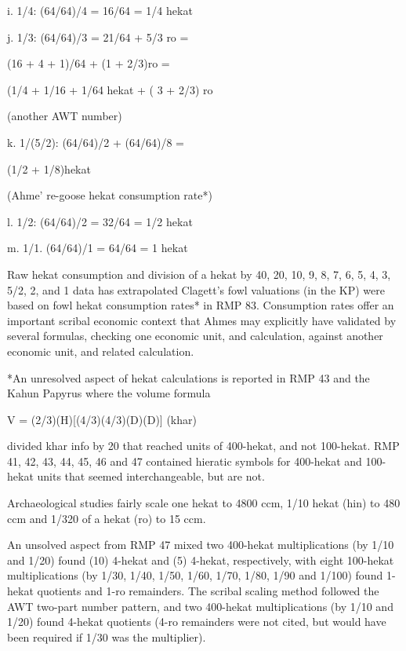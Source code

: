 \documentclass[12pt]{article}
\begin{document}
i. 1/4: (64/64)/4 = 16/64 = 1/4 hekat

j. 1/3: (64/64)/3 = 21/64 + 5/3 ro =

(16 + 4 + 1)/64 + (1 + 2/3)ro =

(1/4 + 1/16 + 1/64 hekat + ( 3 + 2/3) ro

(another AWT number)

k. 1/(5/2): (64/64)/2 + (64/64)/8 =

(1/2 + 1/8)hekat

(Ahme' re-goose hekat consumption rate*)

l. 1/2: (64/64)/2 = 32/64 = 1/2 hekat

m. 1/1. (64/64)/1 = 64/64 = 1 hekat

Raw hekat consumption and division of a hekat by 40, 20, 10,  9, 8, 7, 6, 5, 4, 3, 5/2, 2, and 1 data has extrapolated Clagett's fowl valuations (in the KP) were based on fowl hekat consumption rates* in RMP 83. Consumption rates offer an important scribal economic context that Ahmes may explicitly have validated by several formulas, checking one economic unit, and calculation, against another economic unit, and related calculation.

*An unresolved aspect of hekat calculations is reported in RMP 43 and the Kahun Papyrus where the volume formula

V = (2/3)(H)[(4/3)(4/3)(D)(D)] (khar) 

divided khar info by 20 that reached units of 400-hekat, and not 100-hekat. RMP 41, 42, 43, 44, 45, 46 and 47 contained hieratic symbols for 400-hekat and 100-hekat units that seemed interchangeable, but are not. 

Archaeological studies fairly scale one hekat to 4800 ccm, 1/10 hekat (hin) to 480 ccm and 1/320 of a hekat (ro) to 15 ccm. 

An unsolved aspect from RMP 47 mixed two 400-hekat multiplications (by 1/10 and 1/20) found (10) 4-hekat and (5) 4-hekat, respectively, with eight 100-hekat multiplications (by 1/30, 1/40, 1/50, 1/60, 1/70, 1/80, 1/90 and 1/100) found 1-hekat quotients and 1-ro remainders. The scribal scaling method followed the AWT two-part number pattern, and two 400-hekat multiplications (by 1/10 and 1/20) found 4-hekat quotients (4-ro remainders were not cited, but would have been required if 1/30 was the multiplier).  
\end{document}
